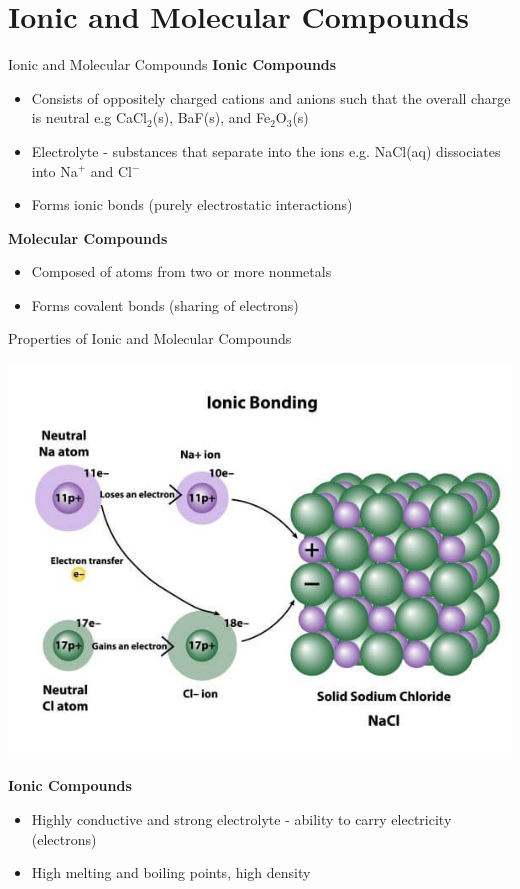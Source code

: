 \documentclass[11pt]{beamer}
\begin{document}
\section{Ionic and Molecular Compounds}

\begin{frame}{Ionic and Molecular Compounds}
  \textbf{Ionic Compounds}
  \begin{itemize}
  \item Consists of oppositely charged cations and anions
    such that the overall charge is neutral e.g CaCl$_2$(s),
    BaF(s), and Fe$_2$O$_3$(s)
  \item Electrolyte - substances that separate into the ions
    e.g. NaCl(aq) dissociates into Na$^+$ and Cl$^-$
  \item Forms ionic bonds (purely electrostatic interactions)
  \end{itemize}

  \textbf{Molecular Compounds}
  \begin{itemize}
  \item Composed of atoms from two or more nonmetals
  \item Forms covalent bonds (sharing of electrons)
  \end{itemize}
\end{frame}

\begin{frame}{Properties of Ionic and Molecular Compounds}
  \begin{center}
    \includegraphics[width=0.6\linewidth]{Ionic-bond-example}
  \end{center}
  \vspace{-0.3in}
  \textbf{Ionic Compounds}
  \begin{itemize}
  \item Highly conductive and strong electrolyte - ability to
    carry electricity (electrons)
  \item High melting and boiling points, high density
  \end{itemize}
\end{frame}
\end{document}
